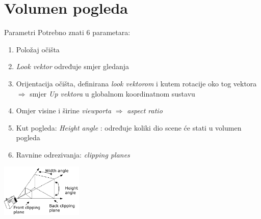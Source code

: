 \documentclass[9pt]{beamer}
\begin{document}
\section{Volumen pogleda}
\begin{frame}{Parametri }
	Potrebno znati 6 parametara:
	\begin{enumerate}
		\item Položaj očišta
		\item \textit{Look vektor} određuje smjer gledanja
		\item Orijentacija očišta, definirana \textit{look vektorom} i kutem rotacije oko tog vektora
		$\Rightarrow$ smjer \textit{Up vektora} u globalnom koordinatnom sustavu
		\item Omjer visine i širine \textit{viewporta} $\Rightarrow$ \textit{aspect ratio}
		\item Kut pogleda: \textit{Height angle} : određuje koliki dio scene će stati u volumen pogleda
		\item Ravnine odrezivanja: \textit{clipping planes}
	\end{enumerate}
	\begin{center}
		\includegraphics[height=2.5cm]{slike/01_view_volume.png}
	\end{center}
\end{frame}
\end{document}

